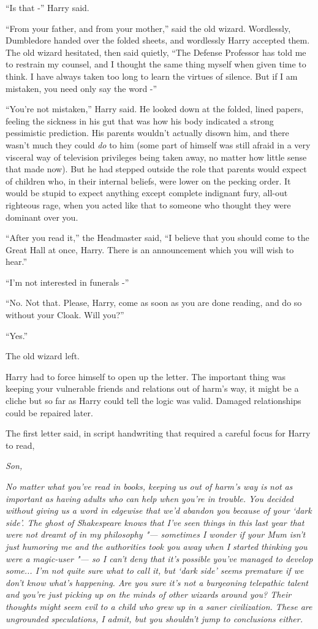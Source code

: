 ``Is that -'' Harry said.

``From your father, and from your mother,'' said the old wizard.
Wordlessly, Dumbledore handed over the folded sheets, and wordlessly
Harry accepted them. The old wizard hesitated, then said quietly, ``The
Defense Professor has told me to restrain my counsel, and I thought the
same thing myself when given time to think. I have always taken too long
to learn the virtues of silence. But if I am mistaken, you need only say
the word -''

``You're not mistaken,'' Harry said. He looked down at the folded, lined
papers, feeling the sickness in his gut that was how his body indicated
a strong pessimistic prediction. His parents wouldn't actually disown
him, and there wasn't much they could \emph{do} to him (some part of
himself was still afraid in a very visceral way of television privileges
being taken away, no matter how little sense that made now). But he had
stepped outside the role that parents would expect of children who, in
their internal beliefs, were lower on the pecking order. It would be
stupid to expect anything except complete indignant fury, all-out
righteous rage, when you acted like that to someone who thought they
were dominant over you.

``After you read it,'' the Headmaster said, ``I believe that you should
come to the Great Hall at once, Harry. There is an announcement which
you will wish to hear.''

``I'm not interested in funerals -''

``No. Not that. Please, Harry, come as soon as you are done reading, and
do so without your Cloak. Will you?''

``Yes.''

The old wizard left.

Harry had to force himself to open up the letter. The important thing
was keeping your vulnerable friends and relations out of harm's way, it
might be a cliche but so far as Harry could tell the logic was valid.
Damaged relationships could be repaired later.

The first letter said, in script handwriting that required a careful
focus for Harry to read,

\emph{Son,}

\emph{No matter what you've read in books, keeping us out of harm's way
is} \emph{not} \emph{as important as having adults who can help when
you're in trouble. You decided without giving us a word in edgewise that
we'd abandon you because of your `dark side'. The ghost of Shakespeare
knows that I've seen things in this last year that were not dreamt of in
my philosophy "--- sometimes I wonder if your Mum isn't just humoring me
and the authorities took you away when I started thinking you were a
magic-user "--- so I can't deny that it's} \emph{possible} \emph{you've
managed to develop some... I'm not quite sure what to call it, but
`dark side' seems premature if we don't know what's happening. Are you
sure it's not a burgeoning telepathic talent and you're just picking up
on the minds of other wizards around you? Their thoughts might seem evil
to a child who grew up in a saner civilization. These are ungrounded
speculations, I admit, but you shouldn't jump to conclusions either.}

